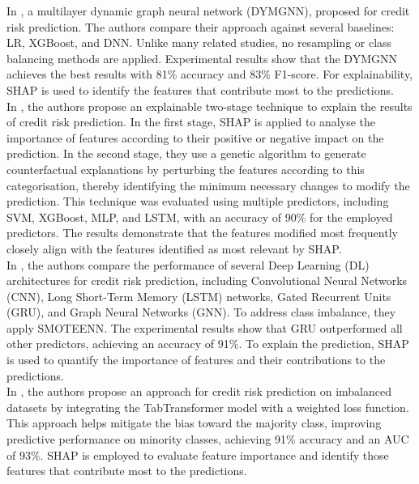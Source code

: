     In \cite{zandi2025attention}, a multilayer dynamic graph neural network (DYMGNN), proposed for credit risk prediction. The authors compare their approach against several baselines: LR, XGBoost, and DNN. Unlike many related studies, no resampling or class balancing methods are applied. Experimental results show that the DYMGNN achieves the best results with 81\% accuracy and 83\% F1-score. For explainability, SHAP is used to identify the features that contribute most to the predictions. \\

    In \cite{wang2025two}, the authors propose an explainable two-stage technique to explain the results of credit risk prediction. In the first stage, SHAP is applied to analyse the importance of features according to their positive or negative impact on the prediction. In the second stage, they use a genetic algorithm to generate counterfactual explanations by perturbing the features according to this categorisation, thereby identifying the minimum necessary changes to modify the prediction. This technique was evaluated using multiple predictors, including SVM, XGBoost, MLP, and LSTM, with an accuracy of 90\% for the employed predictors. The results demonstrate that the features modified most frequently closely align with the features identified as most relevant by SHAP.\\

    In \cite{aruleba2025enhanced}, the authors compare the performance of several Deep Learning (DL) architectures for credit risk prediction, including Convolutional Neural Networks (CNN), Long Short-Term Memory (LSTM) networks, Gated Recurrent Units (GRU), and Graph Neural Networks (GNN). To address class imbalance, they apply SMOTEENN. The experimental results show that GRU outperformed all other predictors, achieving an accuracy of 91\%. To explain the prediction, SHAP is used to quantify the importance of features and their contributions to the predictions.\\

    In \cite{hartomo2025novel}, the authors propose an approach for credit risk prediction on imbalanced datasets by integrating the TabTransformer model with a weighted loss function. This approach helps mitigate the bias toward the majority class, improving predictive performance on minority classes, achieving 91\% accuracy and an AUC of 93\%. SHAP is employed to evaluate feature importance and identify those features that contribute most to the predictions.\\
    

